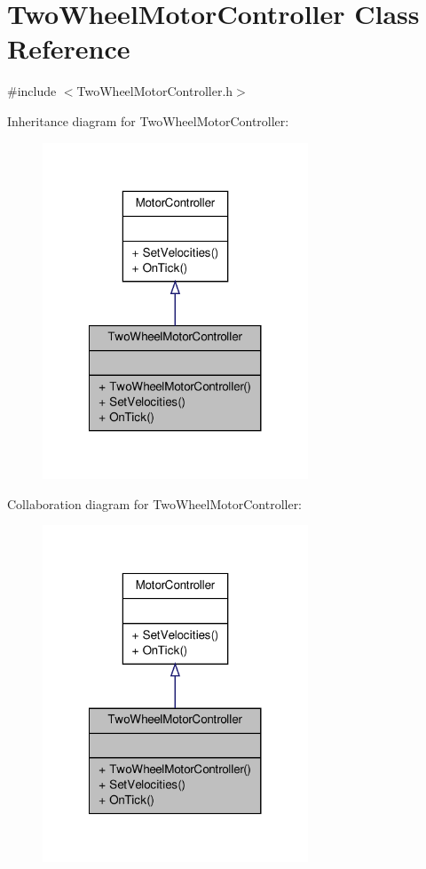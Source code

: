 \hypertarget{class_two_wheel_motor_controller}{\section{Two\-Wheel\-Motor\-Controller Class Reference}
\label{class_two_wheel_motor_controller}
}


{\ttfamily \#include $<$Two\-Wheel\-Motor\-Controller.\-h$>$}



Inheritance diagram for Two\-Wheel\-Motor\-Controller\-:
\nopagebreak
\begin{figure}[H]
\begin{center}
\leavevmode
\includegraphics[width=224pt]{class_two_wheel_motor_controller__inherit__graph}
\end{center}
\end{figure}


Collaboration diagram for Two\-Wheel\-Motor\-Controller\-:
\nopagebreak
\begin{figure}[H]
\begin{center}
\leavevmode
\includegraphics[width=224pt]{class_two_wheel_motor_controller__coll__graph}
\end{center}
\end{figure}
